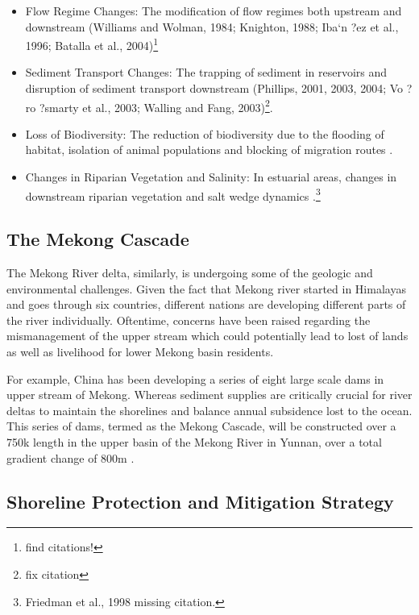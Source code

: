 \begin{itemize}
	\item Flow Regime Changes: The modification of flow regimes both upstream and downstream (Williams and Wolman, 1984; Knighton, 1988; Iba`n ?ez et al., 1996; Batalla et al., 2004)\footnote{find citations!}
	
	\item Sediment Transport Changes: The trapping of sediment in reservoirs and disruption of sediment transport downstream (Phillips, 2001, 2003, 2004; Vo ?ro ?smarty et al., 2003; Walling and Fang, 2003)\footnote{fix citation}. 
  
	\item Loss of Biodiversity: The reduction of biodiversity due to the flooding of habitat, isolation of animal populations and blocking of migration routes \citep{gehrke1995river,  kingsford2000ecological, bunn2002basic}.

	\item Changes in Riparian Vegetation and Salinity: In estuarial areas, changes in downstream riparian vegetation and salt wedge dynamics \citep{wolanski1996fine, allison1998historical}.\footnote{Friedman et al., 1998 missing citation.}
\end{itemize}

\subsection{The Mekong Cascade}

The Mekong River delta, similarly, is undergoing some of the geologic and environmental challenges. Given the fact that Mekong river started in Himalayas and goes through six countries, different nations are developing different parts of the river individually. Oftentime, concerns have been raised regarding the mismanagement of the upper stream which could potentially lead to lost of lands as well as livelihood for lower Mekong basin residents. 

For example, China has been developing a series of eight large scale dams in upper stream of Mekong. Whereas sediment supplies are critically crucial for river deltas to maintain the shorelines and balance annual subsidence lost to the ocean. This series of dams, termed as the Mekong Cascade, will be constructed over a 750k length in the upper basin of the Mekong River in Yunnan, over a total gradient change of 800m \citep{plinston1999water}. 

\subsection{Shoreline Protection and Mitigation Strategy}

